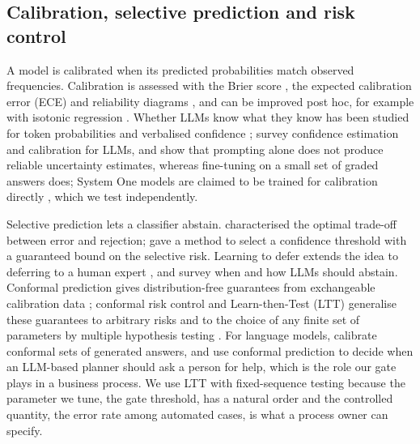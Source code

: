 \documentclass[a4paper,fleqn]{cas-sc}
\theoremstyle{definition}
\begin{document}
\subsection{Calibration, selective prediction and risk control}
A model is calibrated when its predicted probabilities match observed frequencies. Calibration is assessed with the Brier score \citep{brier1950}, the expected calibration error (ECE) and reliability diagrams \citep{naeini2015,guo2017}, and can be improved post hoc, for example with isotonic regression \citep{zadrozny2002}. Whether LLMs know what they know has been studied for token probabilities and verbalised confidence \citep{kadavath2022,tian2023,xiong2024}; \citet{geng2024} survey confidence estimation and calibration for LLMs, and \citet{kapoor2024} show that prompting alone does not produce reliable uncertainty estimates, whereas fine-tuning on a small set of graded answers does; System One models are claimed to be trained for calibration directly \citep{typesafe2026docs}, which we test independently.

Selective prediction lets a classifier abstain. \citet{chow1970} characterised the optimal trade-off between error and rejection; \citet{geifman2017} gave a method to select a confidence threshold with a guaranteed bound on the selective risk. Learning to defer extends the idea to deferring to a human expert \citep{madras2018,mozannar2020,raghu2019}, and \citet{wen2025} survey when and how LLMs should abstain. Conformal prediction gives distribution-free guarantees from exchangeable calibration data \citep{vovk2022}; conformal risk control and Learn-then-Test (LTT) generalise these guarantees to arbitrary risks and to the choice of any finite set of parameters by multiple hypothesis testing \citep{angelopoulos2024crc,angelopoulos2025ltt}. For language models, \citet{quach2024} calibrate conformal sets of generated answers, and \citet{ren2023} use conformal prediction to decide when an LLM-based planner should ask a person for help, which is the role our gate plays in a business process. We use LTT with fixed-sequence testing because the parameter we tune, the gate threshold, has a natural order and the controlled quantity, the error rate among automated cases, is what a process owner can specify.
\end{document}
